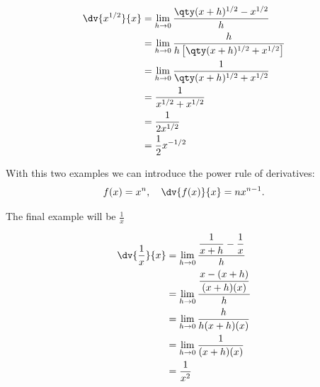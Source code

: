 \documentclass[../main-notes.tex]{subfile}
\begin{document}
\begin{align*}
    \dv{x^{1/2}}{x} &= \lim_{h\to0}\frac{\qty(x+h)^{1/2}-x^{1/2}}{h} \\
                    &= \lim_{h\to0}\frac{h}{h\left[\qty(x+h)^{1/2}+x^{1/2}\right]} \\
                    &= \lim_{h\to0}\frac{1}{\qty(x+h)^{1/2}+x^{1/2}} \\
                    &= \frac{1}{x^{1/2}+x^{1/2}} \\
                    &= \frac{1}{2x^{1/2}} \\
                    &= \frac{1}{2}x^{-1/2}
\end{align*}

With this two examples we can introduce the power rule of derivatives:
\begin{gather*}
    f(x) = x^{n},\quad \dv{f(x)}{x} = n x^{n-1}.
\end{gather*}


The final example will be \(\frac{1}{x}\)

\begin{align*}
    \dv{\dfrac{1}{x}}{x} &= \lim_{h\to0}\dfrac{\dfrac{1}{x+h}-\dfrac{1}{x}}{h} \\
                    &= \lim_{h\to0}\frac{\dfrac{x-(x+h)}{(x+h)(x)}}{h} \\
                    &= \lim_{h\to0}\frac{h}{h(x+h)(x)} \\
                    &= \lim_{h\to0}\frac{1}{(x+h)(x)} \\
                    &= \dfrac{1}{x^{2}}
\end{align*}
\end{document}
